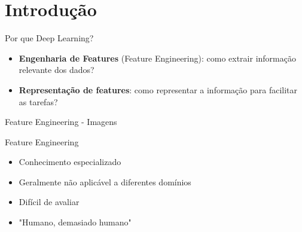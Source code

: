 \documentclass[10pt]{beamer}
\begin{document}
\nocite{DeepLearningbook}
\nocite{xiao2017/online}
\nocite{Dumoulin16}
\maketitle

\section{Introdução}
\begin{frame}[fragile]{Por que Deep Learning?}
\fontsize{12pt}{12}
\begin{itemize}
	\item \textbf{Engenharia de Features} (\alert{Feature Engineering}): como extrair informação relevante dos dados?
    \vspace{2em}
    \item \textbf{Representação de features}: como representar a informação para facilitar as tarefas?
\end{itemize}
\end{frame}
\begin{frame}[fragile]{Feature Engineering - Imagens}

\end{frame}

\begin{frame}[fragile]{Feature Engineering}
\fontsize{12pt}{12}
\begin{itemize}
	\item Conhecimento especializado
    \vspace{1em}
	\item Geralmente não aplicável a diferentes domínios
    \vspace{1em}
    \item Difícil de avaliar
    \vspace{1em}
	\item "Humano, demasiado humano"
\end{itemize}
\end{frame}
\end{document}

